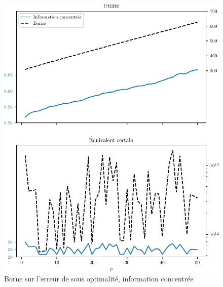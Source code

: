 \begin{figure}[h]
  \centering
  \includegraphics[width=\textwidth]{../../experiments/fig/pconst_so_conc.pdf}
  \caption[Borne sur l'erreur de S.O. I]{Borne sur l'erreur de sous optimalité,
    information concentrée}
  \label{fig_pconst_so_conc}
\end{figure}

